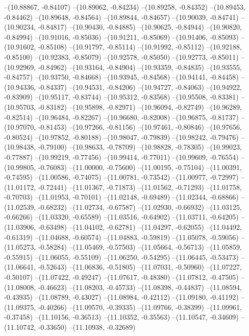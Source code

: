 --(10.88867, -0.84107)
--(10.89062, -0.84234)
--(10.89258, -0.84352)
--(10.89453, -0.84462)
--(10.89648, -0.84564)
--(10.89844, -0.84657)
--(10.90039, -0.84741)
--(10.90234, -0.84817)
--(10.90430, -0.84885)
--(10.90625, -0.84944)
--(10.90820, -0.84994)
--(10.91016, -0.85036)
--(10.91211, -0.85069)
--(10.91406, -0.85093)
--(10.91602, -0.85108)
--(10.91797, -0.85114)
--(10.91992, -0.85112)
--(10.92188, -0.85100)
--(10.92383, -0.85079)
--(10.92578, -0.85050)
--(10.92773, -0.85011)
--(10.92969, -0.84962)
--(10.93164, -0.84904)
--(10.93359, -0.84835)
--(10.93555, -0.84757)
--(10.93750, -0.84668)
--(10.93945, -0.84568)
--(10.94141, -0.84458)
--(10.94336, -0.84337)
--(10.94531, -0.84206)
--(10.94727, -0.84063)
--(10.94922, -0.83909)
--(10.95117, -0.83744)
--(10.95312, -0.83568)
--(10.95508, -0.83381)
--(10.95703, -0.83182)
--(10.95898, -0.82971)
--(10.96094, -0.82749)
--(10.96289, -0.82514)
--(10.96484, -0.82267)
--(10.96680, -0.82008)
--(10.96875, -0.81737)
--(10.97070, -0.81453)
--(10.97266, -0.81156)
--(10.97461, -0.80846)
--(10.97656, -0.80524)
--(10.97852, -0.80188)
--(10.98047, -0.79839)
--(10.98242, -0.79476)
--(10.98438, -0.79100)
--(10.98633, -0.78709)
--(10.98828, -0.78305)
--(10.99023, -0.77887)
--(10.99219, -0.77456)
--(10.99414, -0.77011)
--(10.99609, -0.76554)
--(10.99805, -0.76083)
--(11.00000, -0.75600)
--(11.00195, -0.75104)
--(11.00391, -0.74595)
--(11.00586, -0.74075)
--(11.00781, -0.73542)
--(11.00977, -0.72997)
--(11.01172, -0.72441)
--(11.01367, -0.71873)
--(11.01562, -0.71293)
--(11.01758, -0.70703)
--(11.01953, -0.70101)
--(11.02148, -0.69489)
--(11.02344, -0.68866)
--(11.02539, -0.68232)
--(11.02734, -0.67587)
--(11.02930, -0.66932)
--(11.03125, -0.66266)
--(11.03320, -0.65589)
--(11.03516, -0.64902)
--(11.03711, -0.64205)
--(11.03906, -0.63498)
--(11.04102, -0.62781)
--(11.04297, -0.62055)
--(11.04492, -0.61319)
--(11.04688, -0.60574)
--(11.04883, -0.59819)
--(11.05078, -0.59056)
--(11.05273, -0.58284)
--(11.05469, -0.57503)
--(11.05664, -0.56713)
--(11.05859, -0.55915)
--(11.06055, -0.55109)
--(11.06250, -0.54295)
--(11.06445, -0.53473)
--(11.06641, -0.52643)
--(11.06836, -0.51805)
--(11.07031, -0.50960)
--(11.07227, -0.50107)
--(11.07422, -0.49247)
--(11.07617, -0.48380)
--(11.07812, -0.47505)
--(11.08008, -0.46623)
--(11.08203, -0.45733)
--(11.08398, -0.44837)
--(11.08594, -0.43935)
--(11.08789, -0.43027)
--(11.08984, -0.42112)
--(11.09180, -0.41192)
--(11.09375, -0.40266)
--(11.09570, -0.39335)
--(11.09766, -0.38399)
--(11.09961, -0.37458)
--(11.10156, -0.36513)
--(11.10352, -0.35563)
--(11.10547, -0.34609)
--(11.10742, -0.33650)
--(11.10938, -0.32689)
